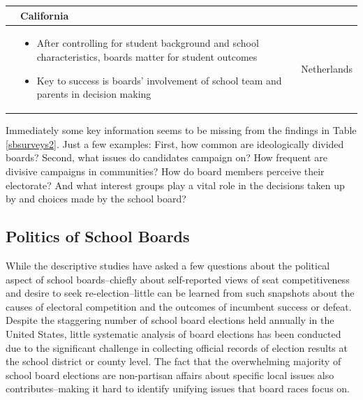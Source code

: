 \begin{small}
\begin{singlespace}
\begin{longtable}{| p{} | p{} | p{}|}
\begin{itemize}
\end{itemize} \vspace{-4mm} & California \\ \hline
\citet{RefWorks:328} & \vspace{-6mm} \begin{itemize} \setlength\itemsep{-2pt} 
\item After controlling for student 
background and school characteristics, boards matter for student outcomes \item Key to success is boards' involvement of
school team and parents in decision making
\end{itemize} \vspace{-4mm} & Netherlands \\ \hline  
\end{longtable}
\end{singlespace}
\end{small}

Immediately some key information seems to be missing from the findings in Table \ref{sbsurveys2}. Just a few examples: First, how common are ideologically divided boards? Second, what issues do candidates campaign on? How frequent are divisive campaigns in communities? How do board members perceive their electorate? And what interest groups play a vital role in the decisions taken up by and choices made by the school board?



\subsection{Politics of School Boards}

While the descriptive studies have asked a few questions about the political aspect of school boards--chiefly about self-reported views of seat competitiveness and desire to seek re-election--little can be learned from such snapshots about the causes of electoral competition and the outcomes of incumbent success or defeat. Despite the staggering number of school board elections held annually in the United States, little systematic analysis of board elections has been conducted due to the significant challenge in collecting official records of election results at the school district or county level. The fact that the overwhelming majority of school board elections are non-partisan affairs about specific local issues also contributes--making it hard to identify unifying issues that board races focus on.


